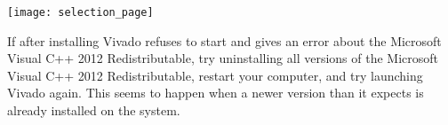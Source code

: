 \begin{center}
    \texttt{[image: selection\_page]}
\end{center}

\begin{mdframed}[style=note]
    If after installing Vivado refuses to start and gives an error about the Microsoft Visual
    C++ 2012 Redistributable, try uninstalling all versions of the Microsoft Visual C++ 2012
    Redistributable, restart your computer, and try launching Vivado again.
    This seems to happen when a newer version than it expects is already installed on the system.
\end{mdframed}
